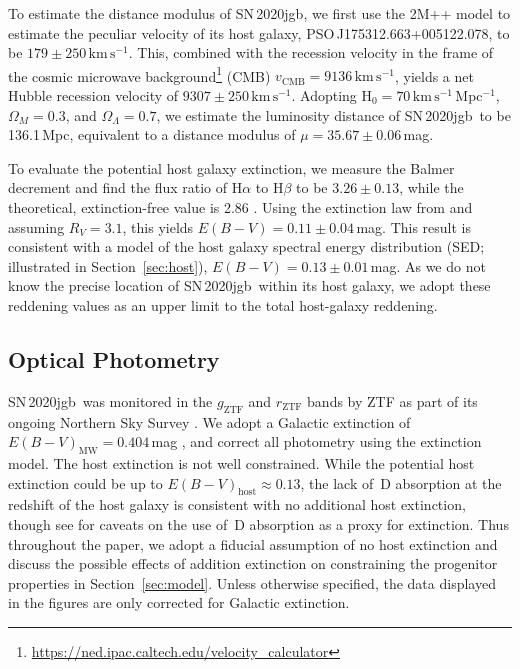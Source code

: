 \documentclass[twocolumn]{aastex631}
\newcommand{\sn}{SN\,2020jgb}
\newcommand{\kms}{$\mathrm{km}\,\mathrm{s}^{-1}$}
\begin{document}
To estimate the distance modulus of \sn, we first use the 2M++ model \citep{Carrick2015_2M++} to estimate the peculiar velocity of its host galaxy, PSO\,J175312.663+005122.078, to be $179\pm250$\,\kms. This, combined with the recession velocity in the frame of the cosmic microwave background\footnote{\url{https://ned.ipac.caltech.edu/velocity_calculator}} (CMB) $v_\mathrm{CMB}=9136$\,\kms, yields a net Hubble recession velocity of $9307\pm250$\,\kms. Adopting H$_0=70$\,\kms\,Mpc$^{-1}$, $\Omega_M=0.3$, and $\Omega_\Lambda=0.7$, we estimate the luminosity distance of \sn\ to be 136.1\,Mpc, equivalent to a distance modulus of $\mu=35.67\pm0.06$\,mag.

To evaluate the potential host galaxy extinction, we measure the Balmer decrement and find the flux ratio of H$\alpha$ to H$\beta$ to be $3.26\pm0.13$, while the theoretical, extinction-free value is 2.86 \citep[assuming case B recombination;][]{Osterbrock_2006}. Using the extinction law from \citet{Fitzpatrick1999} and assuming $R_V=3.1$, this yields $E(B-V)=0.11\pm0.04$\,mag. This result is consistent with a model of the host galaxy spectral energy distribution (SED; illustrated in Section~\ref{sec:host}), $E(B-V)=0.13\pm0.01$\,mag. As we do not know the precise location of \sn\ within its host galaxy, we adopt these reddening values as an upper limit to the total host-galaxy reddening. 

\subsection{Optical Photometry}
\sn\ was monitored in the $g_\mathrm{ZTF}$ and $r_\mathrm{ZTF}$ bands by ZTF as part of its ongoing Northern Sky Survey \citep{Bellm_ZTF_2019b}. We adopt a Galactic extinction of $E(B-V)_\mathrm{MW}=0.404\,$mag \citep{Schlafly2011}, and correct all photometry using the \citet{Fitzpatrick1999} extinction model. The host extinction is not well constrained. While the potential host extinction could be up to $E(B-V)_\mathrm{host}\approx0.13$, the lack of \,D absorption at the redshift of the host galaxy is consistent with no additional host extinction, though see \citet{Poznanski_2011} for caveats on the use of \,D absorption as a proxy for extinction. Thus throughout the paper, we adopt a fiducial assumption of no host extinction and discuss the possible effects of addition extinction on constraining the progenitor properties in Section~\ref{sec:model}. Unless otherwise specified, the data displayed in the figures are only corrected for Galactic extinction.
\end{document}
